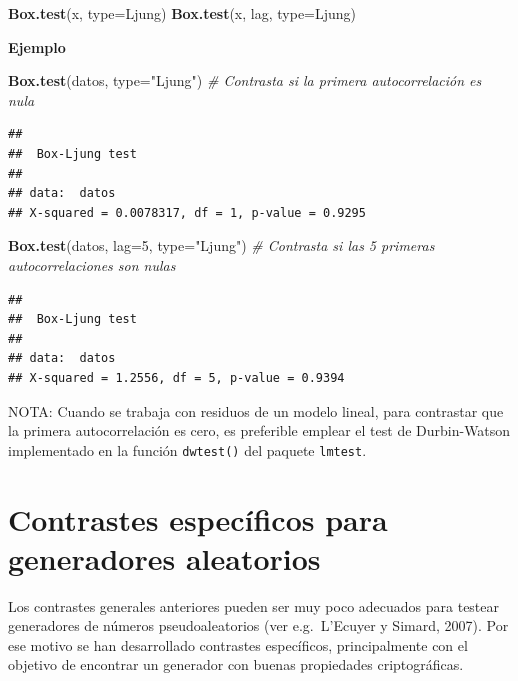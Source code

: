 \documentclass[
]{book}
\newenvironment{Shaded}{\begin{snugshade}}{\end{snugshade}}
\newcommand{\CommentTok}[1]{\textcolor[rgb]{0.56,0.35,0.01}{\textit{#1}}}
\newcommand{\DataTypeTok}[1]{\textcolor[rgb]{0.13,0.29,0.53}{#1}}
\newcommand{\DecValTok}[1]{\textcolor[rgb]{0.00,0.00,0.81}{#1}}
\newcommand{\KeywordTok}[1]{\textcolor[rgb]{0.13,0.29,0.53}{\textbf{#1}}}
\newcommand{\NormalTok}[1]{#1}
\newcommand{\StringTok}[1]{\textcolor[rgb]{0.31,0.60,0.02}{#1}}
\theoremstyle{break}
\theoremstyle{definition}
\theoremstyle{definition}
\theoremstyle{definition}
\theoremstyle{remark}
\begin{document}
\begin{Shaded}
\begin{Highlighting}[]
    \KeywordTok{Box.test}\NormalTok{(x, }\DataTypeTok{type=}\NormalTok{Ljung)}
    \KeywordTok{Box.test}\NormalTok{(x, lag, }\DataTypeTok{type=}\NormalTok{Ljung)}
\end{Highlighting}
\end{Shaded}

\textbf{Ejemplo}

\begin{Shaded}
\begin{Highlighting}[]
\KeywordTok{Box.test}\NormalTok{(datos, }\DataTypeTok{type=}\StringTok{"Ljung"}\NormalTok{) }\CommentTok{# Contrasta si la primera autocorrelación es nula }
\end{Highlighting}
\end{Shaded}

\begin{verbatim}
## 
##  Box-Ljung test
## 
## data:  datos
## X-squared = 0.0078317, df = 1, p-value = 0.9295
\end{verbatim}

\begin{Shaded}
\begin{Highlighting}[]
\KeywordTok{Box.test}\NormalTok{(datos, }\DataTypeTok{lag=}\DecValTok{5}\NormalTok{, }\DataTypeTok{type=}\StringTok{"Ljung"}\NormalTok{) }\CommentTok{# Contrasta si las 5 primeras autocorrelaciones son nulas}
\end{Highlighting}
\end{Shaded}

\begin{verbatim}
## 
##  Box-Ljung test
## 
## data:  datos
## X-squared = 1.2556, df = 5, p-value = 0.9394
\end{verbatim}

NOTA: Cuando se trabaja con residuos de un modelo lineal, para contrastar que la primera autocorrelación es cero, es preferible emplear el test de
Durbin-Watson implementado en la función \texttt{dwtest()} del paquete \texttt{lmtest}.

\hypertarget{contrastes-especuxedficos-para-generadores-aleatorios}{%
\section{Contrastes específicos para generadores aleatorios}\label{contrastes-especuxedficos-para-generadores-aleatorios}}

Los contrastes generales anteriores pueden ser muy poco adecuados para testear generadores de números pseudoaleatorios (ver e.g.~L'Ecuyer y Simard, 2007). Por ese motivo se han desarrollado contrastes específicos, principalmente con el objetivo de encontrar un generador con buenas propiedades criptográficas.
\end{document}
